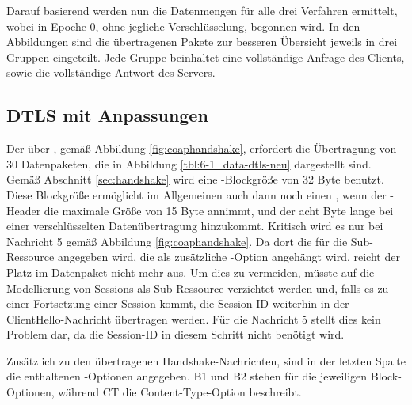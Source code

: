 Darauf basierend werden nun die Datenmengen für alle drei Verfahren ermittelt, wobei in Epoche 0, ohne jegliche Verschlüsselung, begonnen wird.
In den Abbildungen sind die übertragenen Pakete zur besseren Übersicht jeweils in drei Gruppen eingeteilt. Jede Gruppe beinhaltet eine vollständige
Anfrage des Clients, sowie die vollständige Antwort des Servers.

\subsection{DTLS mit Anpassungen}
\label{sec:new-dtls}

Der  über , gemäß Abbildung \ref{fig:coaphandshake}, erfordert die Übertragung von 30 Datenpaketen, die in Abbildung
\ref{tbl:6-1_data-dtls-neu} dargestellt sind. Gemäß Abschnitt \ref{sec:handshake} wird eine -Blockgröße von 32 Byte benutzt. Diese
Blockgröße ermöglicht im Allgemeinen auch dann noch einen , wenn der -Header die maximale Größe von 15 Byte annimmt, und der acht Byte
lange  bei einer verschlüsselten Datenübertragung hinzukommt. Kritisch wird es nur bei Nachricht 5 gemäß Abbildung \ref{fig:coaphandshake}.
Da dort die  für die Sub-Ressource angegeben wird, die als zusätzliche -Option angehängt wird, reicht der Platz im Datenpaket
nicht mehr aus. Um dies zu vermeiden, müsste auf die Modellierung von Sessions als Sub-Ressource verzichtet werden und, falls es zu einer Fortsetzung
einer Session kommt, die Session-ID weiterhin in der ClientHello-Nachricht übertragen werden. Für die Nachricht 5 stellt dies kein Problem dar,
da die Session-ID in diesem Schritt nicht benötigt wird.

Zusätzlich zu den übertragenen Handshake-Nachrichten, sind in der letzten Spalte die enthaltenen -Optionen angegeben. B1 und B2 stehen
für die jeweiligen Block-Optionen, während CT die Content-Type-Option beschreibt.

